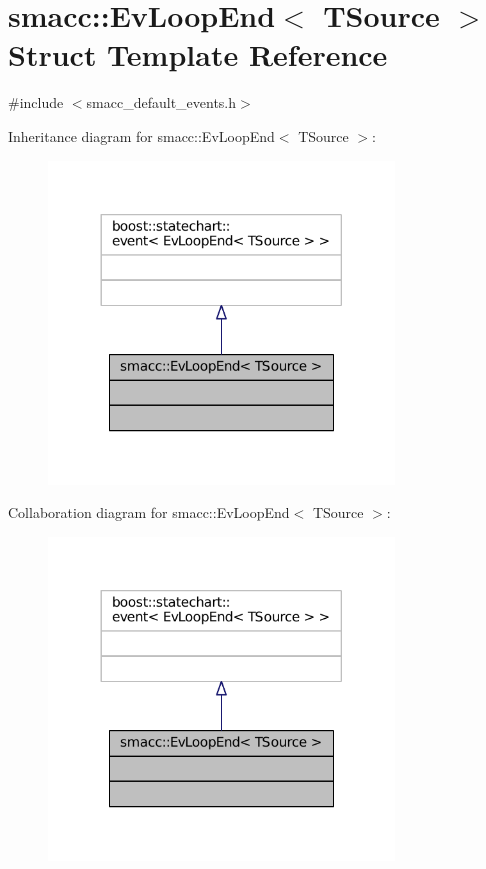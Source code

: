 \hypertarget{structsmacc_1_1EvLoopEnd}{}\section{smacc\+:\+:Ev\+Loop\+End$<$ T\+Source $>$ Struct Template Reference}
\label{structsmacc_1_1EvLoopEnd}


{\ttfamily \#include $<$smacc\+\_\+default\+\_\+events.\+h$>$}



Inheritance diagram for smacc\+:\+:Ev\+Loop\+End$<$ T\+Source $>$\+:
\nopagebreak
\begin{figure}[H]
\begin{center}
\leavevmode
\includegraphics[width=260pt]{structsmacc_1_1EvLoopEnd__inherit__graph}
\end{center}
\end{figure}


Collaboration diagram for smacc\+:\+:Ev\+Loop\+End$<$ T\+Source $>$\+:
\nopagebreak
\begin{figure}[H]
\begin{center}
\leavevmode
\includegraphics[width=260pt]{structsmacc_1_1EvLoopEnd__coll__graph}
\end{center}
\end{figure}


